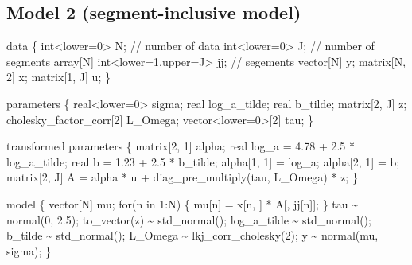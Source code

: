 \documentclass[
  12pt,
  letterpaper,
  DIV=11,
  numbers=noendperiod]{scrartcl}
\newenvironment{Shaded}{\begin{snugshade}}{\end{snugshade}}
\newcommand{\CommentTok}[1]{\textcolor[rgb]{0.37,0.37,0.37}{#1}}
\newcommand{\ControlFlowTok}[1]{\textcolor[rgb]{0.00,0.23,0.31}{#1}}
\newcommand{\DataTypeTok}[1]{\textcolor[rgb]{0.68,0.00,0.00}{#1}}
\newcommand{\DecValTok}[1]{\textcolor[rgb]{0.68,0.00,0.00}{#1}}
\newcommand{\FloatTok}[1]{\textcolor[rgb]{0.68,0.00,0.00}{#1}}
\newcommand{\KeywordTok}[1]{\textcolor[rgb]{0.00,0.23,0.31}{#1}}
\newcommand{\NormalTok}[1]{\textcolor[rgb]{0.00,0.23,0.31}{#1}}
\begin{document}
\newpage

\subsection{Model 2 (segment-inclusive
model)}\label{model-2-segment-inclusive-model}

\begin{Shaded}
\begin{Highlighting}[]
\KeywordTok{data}\NormalTok{ \{}
  \DataTypeTok{int}\NormalTok{\textless{}}\KeywordTok{lower}\NormalTok{=}\DecValTok{0}\NormalTok{\textgreater{} N; }\CommentTok{// number of data}
  \DataTypeTok{int}\NormalTok{\textless{}}\KeywordTok{lower}\NormalTok{=}\DecValTok{0}\NormalTok{\textgreater{} J; }\CommentTok{// number of segments}
  \DataTypeTok{array}\NormalTok{[N] }\DataTypeTok{int}\NormalTok{\textless{}}\KeywordTok{lower}\NormalTok{=}\DecValTok{1}\NormalTok{,}\KeywordTok{upper}\NormalTok{=J\textgreater{} jj; }\CommentTok{// segements}
  \DataTypeTok{vector}\NormalTok{[N] y;}
  \DataTypeTok{matrix}\NormalTok{[N, }\DecValTok{2}\NormalTok{] x;}
  \DataTypeTok{matrix}\NormalTok{[}\DecValTok{1}\NormalTok{, J] u;}
\NormalTok{\}}

\KeywordTok{parameters}\NormalTok{ \{}
  \DataTypeTok{real}\NormalTok{\textless{}}\KeywordTok{lower}\NormalTok{=}\DecValTok{0}\NormalTok{\textgreater{} sigma;}
  \DataTypeTok{real}\NormalTok{ log\_a\_tilde;}
  \DataTypeTok{real}\NormalTok{ b\_tilde;}
  \DataTypeTok{matrix}\NormalTok{[}\DecValTok{2}\NormalTok{, J] z;}
  \DataTypeTok{cholesky\_factor\_corr}\NormalTok{[}\DecValTok{2}\NormalTok{] L\_Omega;}
  \DataTypeTok{vector}\NormalTok{\textless{}}\KeywordTok{lower}\NormalTok{=}\DecValTok{0}\NormalTok{\textgreater{}[}\DecValTok{2}\NormalTok{] tau;}
\NormalTok{\}}

\KeywordTok{transformed parameters}\NormalTok{ \{}
  \DataTypeTok{matrix}\NormalTok{[}\DecValTok{2}\NormalTok{, }\DecValTok{1}\NormalTok{] alpha;}
  \DataTypeTok{real}\NormalTok{ log\_a = }\FloatTok{4.78}\NormalTok{ + }\FloatTok{2.5}\NormalTok{ * log\_a\_tilde;}
  \DataTypeTok{real}\NormalTok{ b = }\FloatTok{1.23}\NormalTok{ + }\FloatTok{2.5}\NormalTok{ * b\_tilde;}
\NormalTok{  alpha[}\DecValTok{1}\NormalTok{, }\DecValTok{1}\NormalTok{] = log\_a;}
\NormalTok{  alpha[}\DecValTok{2}\NormalTok{, }\DecValTok{1}\NormalTok{] = b;}
  \DataTypeTok{matrix}\NormalTok{[}\DecValTok{2}\NormalTok{, J] A = alpha * u + diag\_pre\_multiply(tau, L\_Omega) * z;}
\NormalTok{\}}

\KeywordTok{model}\NormalTok{ \{}
 \DataTypeTok{vector}\NormalTok{[N] mu;}
  \ControlFlowTok{for}\NormalTok{(n }\ControlFlowTok{in} \DecValTok{1}\NormalTok{:N) \{}
\NormalTok{    mu[n] = x[n, ] * A[, jj[n]];}
\NormalTok{  \}}
\NormalTok{  tau \textasciitilde{} normal(}\DecValTok{0}\NormalTok{, }\FloatTok{2.5}\NormalTok{);}
\NormalTok{  to\_vector(z) \textasciitilde{} std\_normal();}
\NormalTok{  log\_a\_tilde \textasciitilde{} std\_normal();}
\NormalTok{  b\_tilde \textasciitilde{} std\_normal();}
\NormalTok{  L\_Omega \textasciitilde{} lkj\_corr\_cholesky(}\DecValTok{2}\NormalTok{);}
\NormalTok{  y \textasciitilde{} normal(mu, sigma);}
\NormalTok{\}}


\end{Highlighting}
\end{Shaded}
\end{document}

